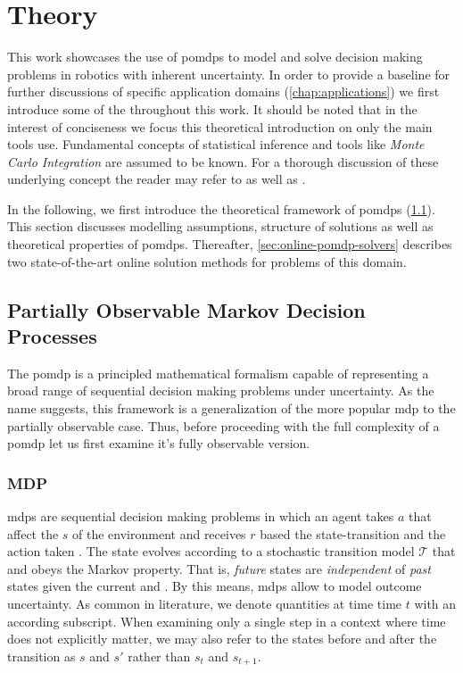 \chapter{Theory}

This work showcases the use of \glspl{pomdp} to model and solve decision making
problems in robotics with inherent uncertainty. In order to provide a baseline
for further discussions of specific application domains
(\cref{chap:applications}) we first introduce some of the throughout this work.
It should be noted that in the interest of conciseness we focus this
theoretical introduction on only the main tools use. Fundamental concepts of
statistical inference and tools like \textit{Monte Carlo Integration} are
assumed to be known. For a thorough discussion of these underlying concept the
reader may refer to \cite{kochenderfer2015decision} as well as
\cite{probRobotics}.

In the following, we first introduce the theoretical framework of \glspl{pomdp}
(\cref{sec:pomdp}). This section discusses modelling assumptions, structure
of solutions as well as theoretical properties of \glspl{pomdp}. Thereafter,
\cref{sec:online-pomdp-solvers} describes two state-of-the-art online solution
methods for problems of this domain.

\section{Partially Observable Markov Decision Processes}\label{sec:pomdp}

The \acf{pomdp} is a principled mathematical formalism capable of representing
a broad range of sequential decision making problems under uncertainty. As the
name suggests, this framework is a generalization of the more popular \ac{mdp}
to the partially observable case. Thus, before proceeding with the full
complexity of a \ac{pomdp} let us first examine it's fully observable version.

\subsection*{MDP}

\glspl{mdp} are sequential decision making problems in which an agent takes
 $a$ that affect the  $s$ of the environment and
receives  $r$ based the state-transition and the action taken
\cite{kochenderfer2015decision}.  The state evolves
according to a stochastic transition model $\mathcal{T}$ that and obeys the
Markov property. That is, \emph{future} states are \emph{independent} of
\emph{past} states given the current  and . By this
means, \glspl{mdp} allow to model outcome uncertainty. As common in literature,
we denote quantities at time time $t$ with an according subscript. When examining
only a single step in a context where time does not explicitly matter, we may also
refer to the states before and after the transition as $s$ and $s'$ rather than
$s_t$ and $s_{t+1}$.

